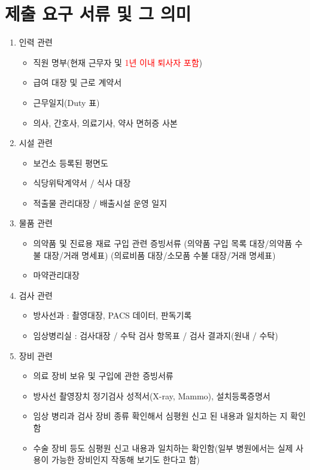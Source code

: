 \clearpage
\section{제출 요구 서류 및 그 의미}
\begin{enumerate}[①]\tightlist
\item 인력 관련
	\begin{itemize}\tightlist
	\item 직원 명부(현재 근무자 및 \textcolor{red}{1년 이내 퇴사자 포함}) 
	\item 급여 대장 및 근로 계약서
	\item 근무일지(Duty 표)
	\item 의사, 간호사, 의료기사, 약사 면허증 사본
	\end{itemize}
\item 시설 관련
	\begin{itemize}\tightlist
	\item 보건소 등록된 평면도
	\item 식당위탁계약서 / 식사 대장
	\item 적출물 관리대장 / 배출시설 운영 일지
	\end{itemize}	
\item 물품 관련
	\begin{itemize}\tightlist
	\item 의약품 및 진료용 재료 구입 관련 증빙서류\newline
 (의약품 구입 목록 대장/의약품 수불 대장/거래 명세표)\newline
 (의료비품 대장/소모품 수불 대장/거래 명세표) 
	\item 마약관리대장
	\end{itemize}	
\item 검사 관련
	\begin{itemize}\tightlist
	\item 방사선과 : 촬영대장, PACS 데이터, 판독기록 
	\item 임상병리실 : 검사대장 / 수탁 검사 항목표 / 검사 결과지(원내 / 수탁)
	\end{itemize}	
\item 장비 관련
	\begin{itemize}\tightlist
	\item 의료 장비 보유 및 구입에 관한 증빙서류
	\item 방사선 촬영장치 정기검사 성적서(X-ray, Mammo), 설치등록증명서
	\item 임상 병리과 검사 장비 종류 확인해서 심평원 신고 된 내용과 일치하는 지 확인함 
	\item 수술 장비 등도 심평원 신고 내용과 일치하는 확인함(일부 병원에서는 실제 사용이 가능한 장비인지 작동해 보기도 한다고 함)

\end{itemize}
\end{enumerate}
